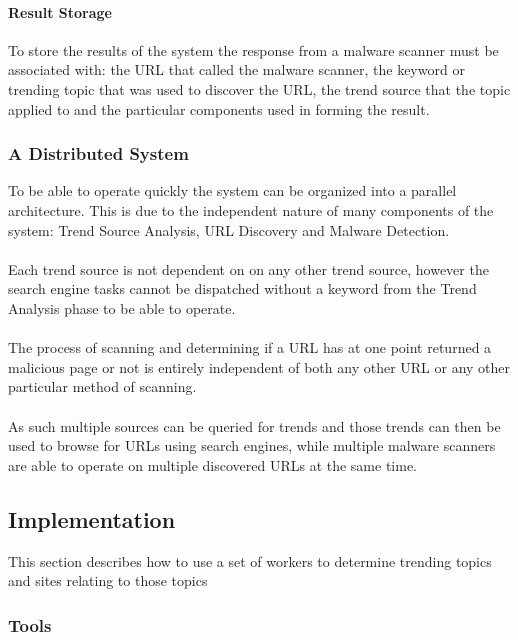 \paragraph{Result Storage}
To store the results of the system the response from a malware scanner must be associated with: the URL that called the malware scanner, the keyword or trending topic that was used to discover the URL, the trend source that the topic applied to and the particular components used in forming the result.

\subsubsection{A Distributed System}
To be able to operate quickly the system can be organized into a parallel architecture. This is due to the independent nature of many components of the system: Trend Source Analysis, URL Discovery and Malware Detection.

\paragraph{}
Each trend source is not dependent on on any other trend source, however the search engine tasks cannot be dispatched without a keyword from the Trend Analysis phase to be able to operate.

\paragraph{}
The process of scanning and determining if a URL has at one point returned a malicious page or not is entirely independent of both any other URL or any other particular method of scanning.

\paragraph{}
As such multiple sources can be queried for trends and those trends can then be used to browse for URLs using search engines, while multiple malware scanners are able to operate on multiple discovered URLs at the same time.

\subsection{Implementation}
This section describes how to use a set of workers to determine trending topics and sites relating to those topics

\subsubsection{Tools}
